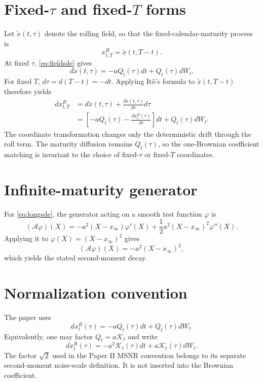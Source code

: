 \documentclass[11pt]{article}
\numberwithin{equation}{section}
\begin{document}
\begin{appendices}
\section{\texorpdfstring{Fixed-$\tau$ and fixed-$T$ forms}{Fixed-tau and fixed-T forms}}

Let $\widetilde x(t,\tau)$ denote the rolling field, so that the fixed-calendar-maturity process is
\begin{equation}
 x_{t,T}^R=\widetilde x(t,T-t).
\end{equation}
At fixed $\tau$, \eqref{eq:fieldsde} gives
\begin{equation}
 d\widetilde x(t,\tau)
 =-aQ_t(\tau)dt+Q_t(\tau)dW_t.
\end{equation}
For fixed $T$, $d\tau=d(T-t)=-dt$. Applying It\^o's formula to $\widetilde x(t,T-t)$ therefore yields
\begin{align}
 d x_{t,T}^R
 &=d\widetilde x(t,\tau)
 +\frac{\partial\widetilde x(t,\tau)}{\partial\tau}d\tau
 \nonumber\\
 &=\left[-aQ_t(\tau)-\frac{\partial x_t^R(\tau)}{\partial\tau}\right]dt
 +Q_t(\tau)dW_t.
\end{align}
The coordinate transformation changes only the deterministic drift through the roll term. The maturity diffusion remains $Q_t(\tau)$, so the one-Brownian coefficient matching is invariant to the choice of fixed-$\tau$ or fixed-$T$ coordinates.

\section{Infinite-maturity generator}

For \eqref{eq:longsde}, the generator acting on a smooth test function $\varphi$ is
\begin{equation}
 (\mathcal A\varphi)(X)
 =-a^2(X-x_\infty)\varphi'(X)
 +\frac12a^2(X-x_\infty)^2\varphi''(X).
\end{equation}
Applying it to $\varphi(X)=(X-x_\infty)^2$ gives
\begin{equation}
 (\mathcal A\varphi)(X)=-a^2(X-x_\infty)^2,
\end{equation}
which yields the stated second-moment decay.

\section{Normalization convention}

The paper uses
\begin{equation}
 dx_t^R(\tau)=-aQ_t(\tau)dt+Q_t(\tau)dW_t.
\end{equation}
Equivalently, one may factor $Q_t=a\mathcal K_t$ and write
\begin{equation}
 dx_t^R(\tau)=-a^2\mathcal K_t(\tau)dt+a\mathcal K_t(\tau)dW_t.
\end{equation}
The factor $\sqrt2$ used in the Paper II MSNR convention belongs to its separate second-moment noise-scale definition. It is not inserted into the Brownian coefficient.


\end{appendices}
\end{document}
